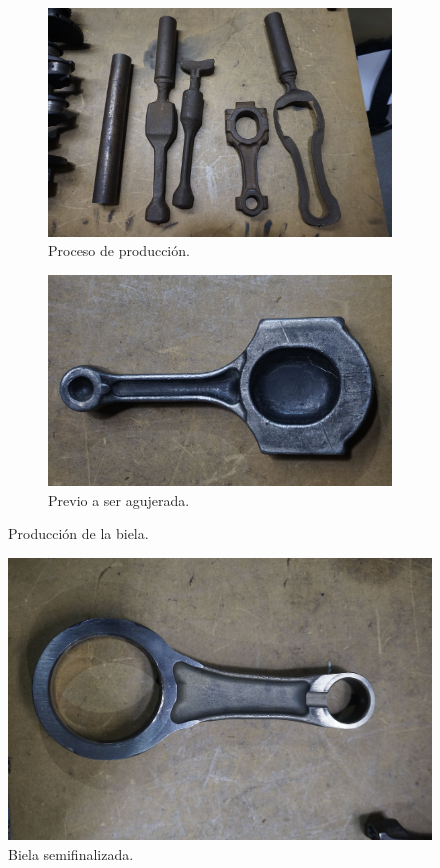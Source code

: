 \begin{figure}[H]
	\centering
	\begin{subfigure}[b]{0.45\textwidth}
		\centering
		\includegraphics[width=\linewidth]{Figures/02/m4/conrod_steps.jpg}
		\caption{Proceso de producción.}
		\label{fig:forja_1}
	\end{subfigure}
	\hfill
	\begin{subfigure}[b]{0.45\textwidth}
 		\centering
 		\includegraphics[width=\linewidth]{Figures/02/m4/conrod_raw.jpg}
 		\caption{Previo a ser agujerada.}
		\label{fig:forja_2}
	\end{subfigure}    
	\caption{Producción de la biela.}
	\label{fig:wrought}
\end{figure}

\begin{figure}[H]
	\centering
	\includegraphics[width=0.6\linewidth]{Figures/02/m4/conrod.jpg}
	\caption{Biela semifinalizada.}
	\label{fig:conrod}
\end{figure}

